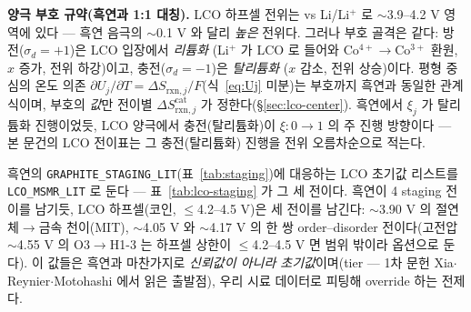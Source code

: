 \documentclass[11pt,a4paper]{article}
\newcommand{\rxn}{\mathrm{rxn}}
\newcommand{\code}[1]{\texttt{#1}}
\begin{document}
\textbf{양극 부호 규약(흑연과 1:1 대칭).} LCO 하프셀 전위는 vs Li/Li$^+$ 로 $\sim$3.9--4.2 V 영역에 있다 — 흑연 음극의
$\sim$0.1 V 와 달리 \emph{높은} 전위다. 그러나 부호 골격은 같다: 방전($\sigma_d=+1$)은 LCO 입장에서 \emph{리튬화}
(Li$^+$ 가 LCO 로 들어와 Co$^{4+}\!\to$Co$^{3+}$ 환원, $x$ 증가, 전위 하강)이고, 충전($\sigma_d=-1$)은 \emph{탈리튬화}
($x$ 감소, 전위 상승)이다. 평형 중심의 온도 의존 $\partial U_j/\partial T=\Delta S_{\rxn,j}/F$(식~\eqref{eq:Uj} 미분)는
부호까지 흑연과 동일한 관계식이며, 부호의 \emph{값}만 전이별 $\Delta S_{\rxn,j}^\mathrm{cat}$ 가 정한다(\S\ref{sec:lco-center}).
흑연에서 $\xi_j$ 가 탈리튬화 진행이었듯, LCO 양극에서 충전(탈리튬화)이 $\xi:0\!\to\!1$ 의 주 진행 방향이다 — 본 문건의
LCO 전이표는 그 충전(탈리튬화) 진행을 전위 오름차순으로 적는다.

흑연의 \code{GRAPHITE\_STAGING\_LIT}(표~\ref{tab:staging})에 대응하는 LCO 초기값 리스트를
\code{LCO\_MSMR\_LIT} 로 둔다 — 표~\ref{tab:lco-staging} 가 그 세 전이다. 흑연이 4 staging 전이를 남기듯, LCO
하프셀(코인, $\le$4.2--4.5 V)은 세 전이를 남긴다\cite{xia2007}: $\sim$3.90 V 의 절연체$\to$금속 천이(MIT), $\sim$4.05 V 와
$\sim$4.17 V 의 한 쌍 order--disorder 전이다(고전압 $\sim$4.55 V 의 O3$\to$H1-3 는 하프셀 상한이 $\le$4.2--4.5 V 면
범위 밖이라 옵션으로 둔다). 이 값들은 흑연과 마찬가지로 \emph{신뢰값이 아니라 초기값}이며(tier — 1차 문헌
Xia\cite{xia2007}$\cdot$Reynier\cite{reynier2004}$\cdot$Motohashi\cite{motohashi2009} 에서 읽은 출발점), 우리 시료 데이터로
피팅해 override 하는 전제다.
\end{document}
